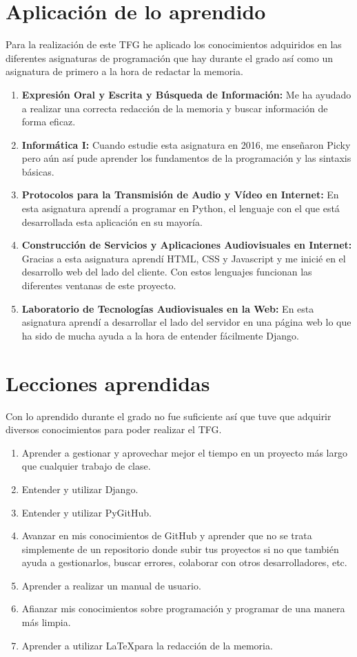 \documentclass[a4paper, 12pt]{book}
\begin{document}
\section{Aplicación de lo aprendido}
\label{sec:aplicacion}
Para la realización de este TFG he aplicado los conocimientos adquiridos en las diferentes asignaturas de programación que hay durante el grado así como un asignatura de primero a la hora de redactar la memoria.
\begin{enumerate}
  \item \textbf{Expresión Oral y Escrita y Búsqueda de Información:} Me ha ayudado a realizar una correcta redacción de la memoria y buscar información de forma eficaz.
  \item \textbf{Informática I:} Cuando estudie esta asignatura en 2016, me enseñaron Picky pero aún así pude aprender los fundamentos de la programación y las sintaxis básicas.
  \item \textbf{Protocolos para la Transmisión de Audio y Vídeo en Internet:} En esta asignatura aprendí a programar en Python, el lenguaje con el que está desarrollada esta aplicación en su mayoría.
  \item \textbf{Construcción de Servicios y Aplicaciones Audiovisuales en Internet:} Gracias a esta asignatura aprendí HTML, CSS y Javascript y me inicié en el desarrollo web del lado del cliente. Con estos lenguajes funcionan las diferentes ventanas de este proyecto.
  \item \textbf{Laboratorio de Tecnologías Audiovisuales en la Web:} En esta asignatura aprendí a desarrollar el lado del servidor en una página web lo que ha sido de mucha ayuda a la hora de entender fácilmente Django.
\end{enumerate}
\section{Lecciones aprendidas}
\label{sec:lecciones_aprendidas}
Con lo aprendido durante el grado no fue suficiente así que tuve que adquirir diversos conocimientos para poder realizar el TFG.
\begin{enumerate}
  \item Aprender a gestionar y aprovechar mejor el tiempo en un proyecto más largo que cualquier trabajo de clase.
  \item Entender y utilizar Django.
  \item Entender y utilizar PyGitHub.
  \item Avanzar en mis conocimientos de GitHub y aprender que no se trata simplemente de un repositorio donde subir tus proyectos si no que también ayuda a gestionarlos, buscar errores, colaborar con otros desarrolladores, etc.
  \item Aprender a realizar un manual de usuario.
  \item Afianzar mis conocimientos sobre programación y programar de una manera más limpia.
  \item Aprender a utilizar \LaTeX  para la redacción de la memoria.
\end{enumerate}
\end{document}
